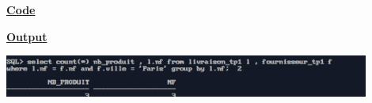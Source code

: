 \newpage
{}

\textbf{\underline{Code}}


\vspace{1cm}
\textbf{\underline{Output}}
\vspace{1cm}
\begin{center}
    \includegraphics[width=0.9\textwidth]{Questions/q33/q33.png}
\end{center}


